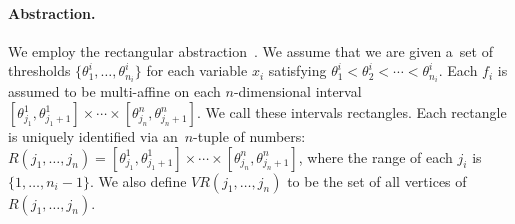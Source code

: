 \documentclass{llncs}
\newcommand{\VR}{\mathit{VR}}
\begin{document}
\paragraph{Abstraction.}
We employ the rectangular abstraction~\cite{BYW+07,GrosuBFGGSB11}.
We assume that we are given a~set of thresholds $\{\theta^i_1, \ldots,
\theta^i_{n_i}\}$ for each variable $x_i$ satisfying $\theta^i_1 < \theta^i_2 <
\cdots < \theta^i_{n_i}$.  Each $f_i$ is assumed to be multi-affine on each
$n$-dimensional interval $[\theta^1_{j_1}, \theta^1_{j_1+1}] \times \cdots
\times [\theta^n_{j_n}, \theta^n_{j_n+1}]$. We call these intervals rectangles.
Each rectangle is uniquely identified via an~$n$-tuple of numbers: %
$ R(j_1, \ldots, j_n) = [\theta^1_{j_1}, \theta^1_{j_1+1}] \times \cdots \times
[\theta^n_{j_n}, \theta^n_{j_n+1}] $, where the range of each $j_i$ is $\{ 1,
\ldots, n_i - 1 \}$. We also define $\VR(j_1, \ldots, j_n)$ to be the set of all
vertices of $R(j_1, \ldots,
j_n)$. %

\end{document}
